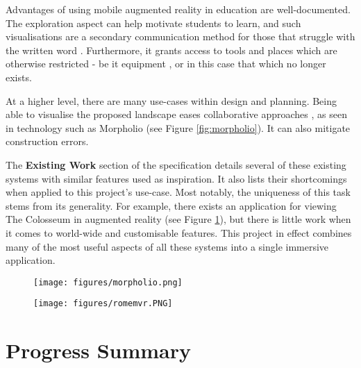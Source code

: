 \documentclass{article}
\begin{document}
Advantages of using mobile augmented reality in education are well-documented. The exploration aspect can help motivate students to learn, and such visualisations are a secondary communication method for those that struggle with the written word \cite{armotivation}. Furthermore, it grants access to tools and places which are otherwise restricted - be it  equipment \cite{placespotentials}, or in this case that which no longer exists.

At a higher level, there are many use-cases within design and planning. Being able to visualise the proposed landscape eases collaborative approaches \cite{ardesign}, as seen in technology such as Morpholio (see Figure \ref{fig:morpholio}). It can also mitigate construction errors.

The \textbf{Existing Work} section of the specification details several of these existing systems with similar features used as inspiration. It also lists their shortcomings when applied to this project's use-case. Most notably, the uniqueness of this task stems from its generality. For example, there exists an application for viewing The Colosseum in augmented reality (see Figure \ref{fig:romemvr}), but there is little work when it comes to world-wide and customisable features. This project in effect combines many of the most useful aspects of all these systems into a single immersive application.

\begin{figure}[h!]
\centering
\begin{minipage}{.5\textwidth}
  \centering
  \texttt{[image: figures/morpholio.png]}
  \label{fig:morpholio}
\end{minipage}%
\begin{minipage}{.5\textwidth}
  \centering
  \texttt{[image: figures/romemvr.PNG]}
  \label{fig:romemvr}
\end{minipage}
\end{figure}



\section{Progress Summary}
\end{document}

